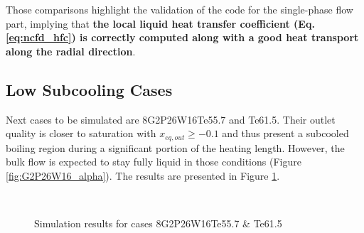 \npar

Those comparisons highlight the validation of the code for the single-phase flow part, implying that \textbf{the local liquid heat transfer coefficient (Eq. \ref{eq:ncfd_hfc}) is correctly computed along with a good heat transport along the radial direction}.


\subsection{Low Subcooling Cases}

Next cases to be simulated are 8G2P26W16Te55.7 and Te61.5. Their outlet quality is closer to saturation with $x_{eq,out} \geq -0.1$ and thus present a subcooled boiling region during a significant portion of the heating length. However, the bulk flow is expected to stay fully liquid in those conditions (Figure \ref{fig:G2P26W16_alpha}). The results are presented in Figure \ref{fig:deb_cfd_8T55_T61}.


\begin{figure}[!h]
\centering
{}
\\
\caption{Simulation results for cases 8G2P26W16Te55.7 \& Te61.5}
\label{fig:deb_cfd_8T55_T61}
\end{figure}

